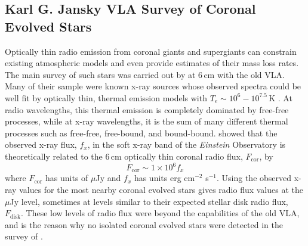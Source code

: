 
\subsection{Karl G. Jansky VLA Survey of Coronal Evolved Stars}\label{sec:8.2.4}
Optically thin radio emission from coronal giants and supergiants can constrain existing atmospheric models and even provide estimates of their mass loss rates. The main survey of such stars was carried out by \cite{drake_1986} at 6\,cm with the old VLA. Many of their sample were known x-ray sources whose observed spectra could be well fit by optically thin, thermal emission models with $T_e \sim 10^6-10^{7.5}$\,K \citep{ayres_1981}. At radio wavelengths, this thermal emission is completely dominated by free-free processes, while at x-ray wavelengths, it is the sum of many different thermal processes such as free-free, free-bound, and bound-bound. \cite{drake_1986} showed that the observed x-ray flux, $f_{x}$, in the soft x-ray band of the \textit{Einstein} Observatory is theoretically related to the 6\,cm optically thin coronal radio flux, $F_{\mathrm{cor}}$, by
\begin{equation}\label{eq:8.1}
F_{\mathrm{cor}} \sim 1\times 10^6{f_x}
\end{equation}
where $F_{\mathrm{cor}}$ has units of $\mu$Jy and $f_x$ has units erg cm$^{-2}$ s$^{-1}$. Using the observed x-ray values for the most nearby coronal evolved stars gives radio flux values at the $\mu$Jy level, sometimes at levels similar to their expected stellar disk radio flux, $F_{\mathrm{disk}}$. These low levels of radio flux were  beyond the capabilities of the old VLA, and is the reason why no isolated coronal evolved stars were detected in the survey of \cite{drake_1986}.

